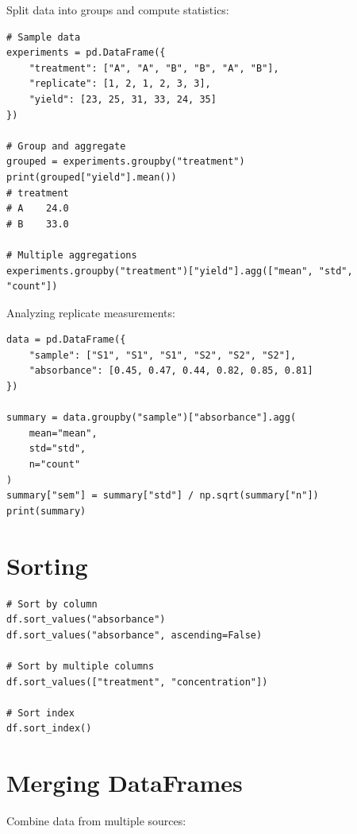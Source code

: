 Split data into groups and compute statistics:

\begin{lstlisting}
# Sample data
experiments = pd.DataFrame({
    "treatment": ["A", "A", "B", "B", "A", "B"],
    "replicate": [1, 2, 1, 2, 3, 3],
    "yield": [23, 25, 31, 33, 24, 35]
})

# Group and aggregate
grouped = experiments.groupby("treatment")
print(grouped["yield"].mean())
# treatment
# A    24.0
# B    33.0

# Multiple aggregations
experiments.groupby("treatment")["yield"].agg(["mean", "std", "count"])
\end{lstlisting}

\begin{labexample}
Analyzing replicate measurements:

\begin{lstlisting}
data = pd.DataFrame({
    "sample": ["S1", "S1", "S1", "S2", "S2", "S2"],
    "absorbance": [0.45, 0.47, 0.44, 0.82, 0.85, 0.81]
})

summary = data.groupby("sample")["absorbance"].agg(
    mean="mean",
    std="std",
    n="count"
)
summary["sem"] = summary["std"] / np.sqrt(summary["n"])
print(summary)
\end{lstlisting}
\end{labexample}

\section{Sorting}
\label{sec:sorting}

\begin{lstlisting}
# Sort by column
df.sort_values("absorbance")
df.sort_values("absorbance", ascending=False)

# Sort by multiple columns
df.sort_values(["treatment", "concentration"])

# Sort index
df.sort_index()
\end{lstlisting}

\section{Merging DataFrames}
\label{sec:merging}

Combine data from multiple sources:

